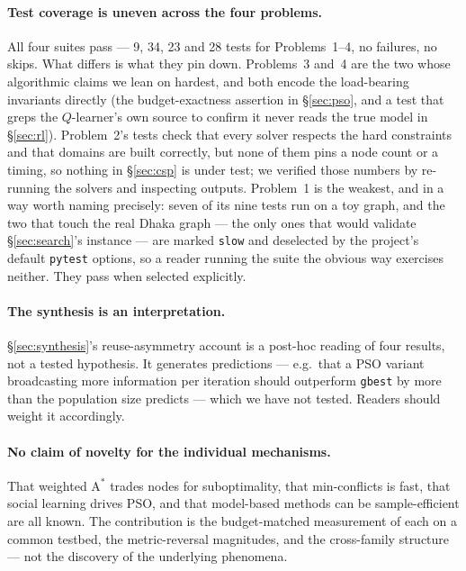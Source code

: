\documentclass[11pt]{article}
\begin{document}
\paragraph{Test coverage is uneven across the four problems.} All four suites pass --- 9, 34, 23
and 28 tests for Problems~1--4, no failures, no skips. What differs is what they pin down.
Problems~3 and~4 are the two whose algorithmic claims we lean on hardest, and both encode the
load-bearing invariants directly (the budget-exactness assertion in \S\ref{sec:pso}, and a test
that greps the $Q$-learner's own source to confirm it never reads the true model in
\S\ref{sec:rl}). Problem~2's tests check that every solver respects the hard constraints and that
domains are built correctly, but none of them pins a node count or a timing, so nothing in
\S\ref{sec:csp} is under test; we verified those numbers by re-running the solvers and inspecting
outputs. Problem~1 is the weakest, and in a way worth naming precisely: seven of its nine tests run
on a toy graph, and the two that touch the real Dhaka graph --- the only ones that would validate
\S\ref{sec:search}'s instance --- are marked \texttt{slow} and deselected by the project's default
\texttt{pytest} options, so a reader running the suite the obvious way exercises neither. They pass
when selected explicitly.

\paragraph{The synthesis is an interpretation.} \S\ref{sec:synthesis}'s reuse-asymmetry account is
a post-hoc reading of four results, not a tested hypothesis. It generates predictions --- e.g.\ that
a PSO variant broadcasting more information per iteration should outperform \texttt{gbest} by more
than the population size predicts --- which we have not tested. Readers should weight it
accordingly.

\paragraph{No claim of novelty for the individual mechanisms.} That weighted $\mathrm{A}^*$
trades nodes for suboptimality, that min-conflicts is fast, that social learning drives PSO, and
that model-based methods can be sample-efficient are all known. The contribution is the
budget-matched measurement of each on a common testbed, the metric-reversal magnitudes, and the
cross-family structure --- not the discovery of the underlying phenomena.
\end{document}

